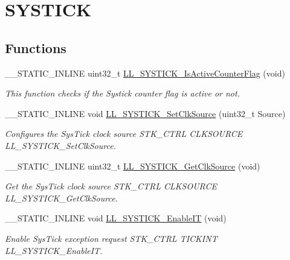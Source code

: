 \hypertarget{group___c_o_r_t_e_x___l_l___e_f___s_y_s_t_i_c_k}{}\section{S\+Y\+S\+T\+I\+CK}
\label{group___c_o_r_t_e_x___l_l___e_f___s_y_s_t_i_c_k}
\subsection*{Functions}
\begin{DoxyCompactItemize}
\item 
\+\_\+\+\_\+\+S\+T\+A\+T\+I\+C\+\_\+\+I\+N\+L\+I\+NE uint32\+\_\+t \hyperlink{group___c_o_r_t_e_x___l_l___e_f___s_y_s_t_i_c_k_gaf5dfb37d859552753594f9cc66431ba6}{L\+L\+\_\+\+S\+Y\+S\+T\+I\+C\+K\+\_\+\+Is\+Active\+Counter\+Flag} (void)
\begin{DoxyCompactList}\small\item\em This function checks if the Systick counter flag is active or not. \end{DoxyCompactList}\item 
\+\_\+\+\_\+\+S\+T\+A\+T\+I\+C\+\_\+\+I\+N\+L\+I\+NE void \hyperlink{group___c_o_r_t_e_x___l_l___e_f___s_y_s_t_i_c_k_gaaf98ae8e0298b44c5d58a3ba9ef358f7}{L\+L\+\_\+\+S\+Y\+S\+T\+I\+C\+K\+\_\+\+Set\+Clk\+Source} (uint32\+\_\+t Source)
\begin{DoxyCompactList}\small\item\em Configures the Sys\+Tick clock source  S\+T\+K\+\_\+\+C\+T\+RL C\+L\+K\+S\+O\+U\+R\+CE L\+L\+\_\+\+S\+Y\+S\+T\+I\+C\+K\+\_\+\+Set\+Clk\+Source. \end{DoxyCompactList}\item 
\+\_\+\+\_\+\+S\+T\+A\+T\+I\+C\+\_\+\+I\+N\+L\+I\+NE uint32\+\_\+t \hyperlink{group___c_o_r_t_e_x___l_l___e_f___s_y_s_t_i_c_k_ga2cfeb1396db13a9fbc208cc659064b19}{L\+L\+\_\+\+S\+Y\+S\+T\+I\+C\+K\+\_\+\+Get\+Clk\+Source} (void)
\begin{DoxyCompactList}\small\item\em Get the Sys\+Tick clock source  S\+T\+K\+\_\+\+C\+T\+RL C\+L\+K\+S\+O\+U\+R\+CE L\+L\+\_\+\+S\+Y\+S\+T\+I\+C\+K\+\_\+\+Get\+Clk\+Source. \end{DoxyCompactList}\item 
\+\_\+\+\_\+\+S\+T\+A\+T\+I\+C\+\_\+\+I\+N\+L\+I\+NE void \hyperlink{group___c_o_r_t_e_x___l_l___e_f___s_y_s_t_i_c_k_ga770fac4394ddde9a53e1a236c81538f0}{L\+L\+\_\+\+S\+Y\+S\+T\+I\+C\+K\+\_\+\+Enable\+IT} (void)
\begin{DoxyCompactList}\small\item\em Enable Sys\+Tick exception request  S\+T\+K\+\_\+\+C\+T\+RL T\+I\+C\+K\+I\+NT L\+L\+\_\+\+S\+Y\+S\+T\+I\+C\+K\+\_\+\+Enable\+IT. \end{DoxyCompactList}\item 

\end{DoxyCompactItemize}
